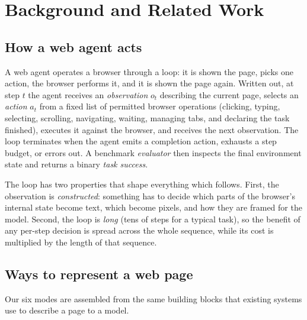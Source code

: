 \chapter{Background and Related Work}
\label{ch:bg}


\section{How a web agent acts}
\label{sec:agent-loop}

A web agent operates a browser through a loop: it is shown the page, picks one
action, the browser performs it, and it is shown the page again. Written out,
at step $t$ the agent receives an \emph{observation} $o_t$ describing the
current page, selects an \emph{action} $a_t$ from a fixed list of permitted
browser operations (clicking, typing, selecting, scrolling, navigating,
waiting, managing tabs, and declaring the task finished), executes it against
the browser, and receives
the next observation. The loop terminates when the agent emits a completion
action, exhausts a step budget, or errors out. A benchmark \emph{evaluator} then
inspects the final environment state and returns a binary \emph{task success}.

The loop has two properties that shape everything which follows. First, the
observation is \emph{constructed}: something has to decide which parts of the
browser's internal state become text, which become pixels, and how they are
framed for the model. Second, the loop is \emph{long} (tens of steps for a
typical task), so the benefit of any per-step decision is spread across the
whole sequence, while its cost is multiplied by the length of that sequence.

\section{Ways to represent a web page}
\label{sec:representations}

Our six modes are assembled from the same building blocks that existing
systems use to describe a page to a model.

